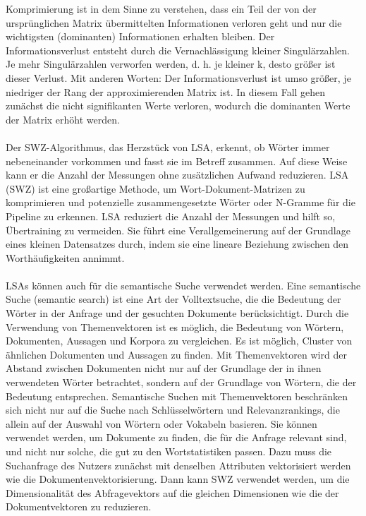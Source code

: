 Komprimierung ist in dem Sinne zu verstehen, dass ein Teil der von der ursprünglichen Matrix übermittelten Informationen verloren geht und nur die wichtigsten (dominanten) Informationen erhalten bleiben. 
Der Informationsverlust entsteht durch die Vernachlässigung kleiner Singulärzahlen. 
Je mehr Singulärzahlen verworfen werden, d. h. je kleiner k, desto größer ist dieser Verlust. 
Mit anderen Worten: Der Informationsverlust ist umso größer, je niedriger der Rang der approximierenden Matrix ist. 
In diesem Fall gehen zunächst die nicht signifikanten Werte verloren, wodurch die dominanten Werte der Matrix erhöht werden.\\\\
Der \ac{SWZ}-Algorithmus, das Herzstück von \ac{LSA}, erkennt, ob Wörter immer nebeneinander vorkommen und fasst sie im Betreff zusammen. 
Auf diese Weise kann er die Anzahl der Messungen ohne zusätzlichen Aufwand reduzieren. 
\ac{LSA} (\ac{SWZ}) ist eine großartige Methode, um Wort-Dokument-Matrizen zu komprimieren und potenzielle zusammengesetzte Wörter oder N-Gramme für die Pipeline zu erkennen. 
\ac{LSA} reduziert die Anzahl der Messungen und hilft so, Übertraining zu vermeiden. 
Sie führt eine Verallgemeinerung auf der Grundlage eines kleinen Datensatzes durch, indem sie eine lineare Beziehung zwischen den Worthäufigkeiten annimmt.\\\\
\ac{LSA}s können auch für die semantische Suche verwendet werden. 
Eine semantische Suche (semantic search) ist eine Art der Volltextsuche, die die Bedeutung der Wörter in der Anfrage und der gesuchten Dokumente berücksichtigt. 
Durch die Verwendung von Themenvektoren ist es möglich, die Bedeutung von Wörtern, Dokumenten, Aussagen und Korpora zu vergleichen. 
Es ist möglich, Cluster von ähnlichen Dokumenten und Aussagen zu finden. 
Mit Themenvektoren wird der Abstand zwischen Dokumenten nicht nur auf der Grundlage der in ihnen verwendeten Wörter betrachtet, sondern auf der Grundlage von Wörtern, die der Bedeutung entsprechen. 
Semantische Suchen mit Themenvektoren beschränken sich nicht nur auf die Suche nach Schlüsselwörtern und Relevanzrankings, die allein auf der Auswahl von Wörtern oder Vokabeln basieren. 
Sie können verwendet werden, um Dokumente zu finden, die für die Anfrage relevant sind, und nicht nur solche, die gut zu den Wortstatistiken passen. 
Dazu muss die Suchanfrage des Nutzers zunächst mit denselben Attributen vektorisiert werden wie die Dokumentenvektorisierung. 
Dann kann \ac{SWZ} verwendet werden, um die Dimensionalität des Abfragevektors auf die gleichen Dimensionen wie die der Dokumentvektoren zu reduzieren. 
